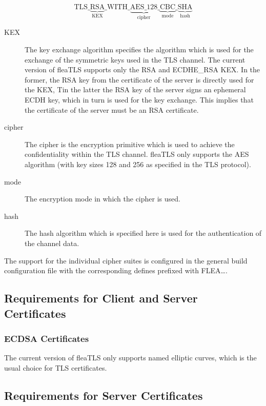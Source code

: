 \documentclass[a4paper,11pt]{scrartcl}
\begin{document}
$$
\mathrm{TLS\_}\underbrace{\mathrm{RSA}}_{\mathrm{KEX}}\mathrm{\_WITH\_}\underbrace{\mathrm{AES\_128}}_{\mathrm{cipher}}\_\underbrace{\mathrm{CBC}}_{\mathrm{mode}
}\_\underbrace{\mathrm{SHA}}_{\mathrm{hash} }
$$
\begin{description}
  \item[KEX] The key exchange algorithm specifies the algorithm which is used
    for the exchange of the symmetric keys used in the TLS channel. The current
    version of fleaTLS supports only the RSA and ECDHE\_RSA KEX. In the former,
    the RSA key from the certificate of the server is directly used for the KEX,
    Tin the latter the RSA key of the server signs an ephemeral ECDH key, which
    in turn is used for the key exchange. This implies that the
    certificate of the server must be an RSA certificate.
  \item[cipher] The cipher is the encryption primitive which is used to achieve
    the confidentiality within the TLS channel. fleaTLS only supports the AES
    algorithm (with key sizes 128 and 256 as specified in the TLS protocol).
  \item [mode] The encryption mode in which the cipher is used. 
  \item[hash] The hash algorithm which is specified here is used for the
    authentication of the channel data.
  \end{description}
The support for the individual cipher suites is configured in the general build
configuration file with the corresponding defines prefixed with FLEA\ldots .

\subsection{Requirements for Client and Server Certificates}

\subsubsection{ECDSA Certificates}

The current version of fleaTLS only supports named elliptic curves, which is the
usual choice for TLS certificates. 


\subsection{Requirements for Server Certificates}
\end{document}
